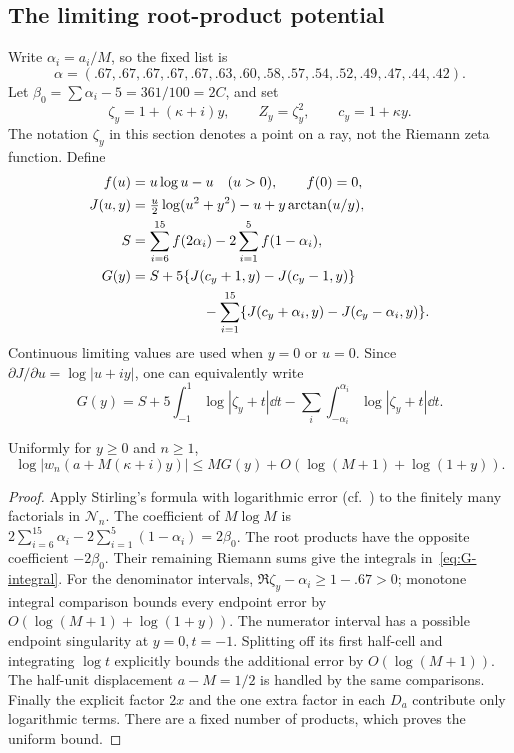 \subsection{The limiting root-product potential}
Write $\alpha_i=a_i/M$, so the fixed list is
\[
 \alpha=(.67,.67,.67,.67,.67,.63,.60,.58,.57,.54,.52,.49,.47,.44,.42).
\]
Let $\beta_0=\sum\alpha_i-5=361/100=2C$, and set
\[
 \zeta_y=1+(\kappa+i)y,\qquad Z_y=\zeta_y^2,\qquad c_y=1+\kappa y.
\]
The notation $\zeta_y$ in this section denotes a point on a ray, not
the Riemann zeta function.  Define
\begin{align}
 f(u)&=u\log u-u\quad(u>0),\qquad f(0)=0,\notag\\
 J(u,y)&=\tfrac u2\log(u^2+y^2)-u+y\arctan(u/y),\notag\\
 S&=\sum_{i=6}^{15}f(2\alpha_i)-2\sum_{i=1}^{5}f(1-\alpha_i),\label{eq:S}\\
 G(y)&=S+5\{J(c_y+1,y)-J(c_y-1,y)\}\notag\\
 &\hspace{18mm}-\sum_{i=1}^{15}\{J(c_y+\alpha_i,y)-J(c_y-\alpha_i,y)\}.
 \label{eq:G}
\end{align}
Continuous limiting values are used when $y=0$ or $u=0$.
Since $\partial J/\partial u=\log|u+iy|$, one can equivalently write
\begin{equation}\label{eq:G-integral}
 G(y)=S+5\int_{-1}^{1}\log|\zeta_y+t|\dd t
                -\sum_i\int_{-\alpha_i}^{\alpha_i}\log|\zeta_y+t|\dd t.
\end{equation}

\begin{lemma}\label{lem:weight-potential}
Uniformly for $y\ge0$ and $n\ge1$,
\begin{equation}\label{eq:weight-potential}
 \log|w_n(a+M(\kappa+i)y)|
 \le MG(y)+O(\log(M+1)+\log(1+y)).
\end{equation}
\end{lemma}
\begin{proof}
Apply Stirling's formula with logarithmic error (cf.~\cite[\S5.11]{DLMF}) to the finitely many
factorials in $\mathcal N_n$.  The coefficient of $M\log M$ is
$2\sum_{i=6}^{15}\alpha_i-2\sum_{i=1}^{5}(1-\alpha_i)=2\beta_0$.
The root products have the opposite coefficient $-2\beta_0$.
Their remaining Riemann sums give the integrals in~\eqref{eq:G-integral}.
For the denominator intervals, $\Re\zeta_y-\alpha_i\ge1-.67>0$;
monotone integral comparison bounds every endpoint error by
$O(\log(M+1)+\log(1+y))$.  The numerator interval has a possible
endpoint singularity at $y=0,t=-1$.  Splitting off its first half-cell
and integrating $\log t$ explicitly bounds the additional error by
$O(\log(M+1))$.  The half-unit displacement $a-M=1/2$ is handled by
the same comparisons.  Finally the explicit factor $2x$ and the
one extra factor in each $D_a$ contribute only logarithmic terms.
There are a fixed number of products, which proves the uniform bound.
\end{proof}

